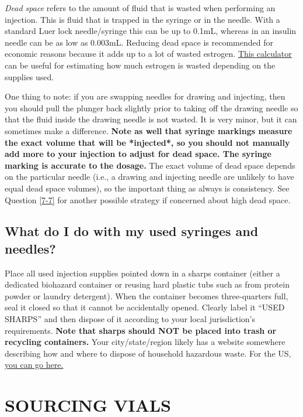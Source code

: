 \documentclass{article}
\begin{document}
\textit{Dead space} refers to the amount of fluid that is wasted when performing an injection. This is fluid that is trapped in the syringe or in the needle. With a standard Luer lock needle/syringe this can be up to 0.1mL, whereas in an insulin needle can be as low as 0.003mL. Reducing dead space is recommended for economic reasons because it adds up to a lot of wasted estrogen. \href{https://hrtcafe.net/Calc/}{This calculator} can be useful for estimating how much estrogen is wasted depending on the supplies used.

One thing to note: if you are swapping needles for drawing and injecting, then you should pull the plunger back slightly prior to taking off the drawing needle so that the fluid inside the drawing needle is not wasted. It is very minor, but it can sometimes make a difference. \textbf{Note as well that syringe markings measure the exact volume that will be *injected*, so you should not manually add more to your injection to adjust for dead space. The syringe marking is accurate to the dosage.} The exact volume of dead space depends on the particular needle (i.e., a drawing and injecting needle are unlikely to have equal dead space volumes), so the important thing as always is consistency. See Question \ref{7-7} for another possible strategy if concerned about high dead space.

\subsection{What do I do with my used syringes and needles?}\label{5-27}

Place all used injection supplies pointed down in a sharps container (either a dedicated biohazard container or reusing hard plastic tubs such as from protein powder or laundry detergent). When the container becomes three-quarters full, seal it closed so that it cannot be accidentally opened. Clearly label it “USED SHARPS” and then dispose of it according to your local jurisdiction's requirements. \textbf{Note that sharps should NOT be placed into trash or recycling containers.} Your city/state/region likely has a website somewhere describing how and where to dispose of household hazardous waste. For the US, \href{https://safeneedledisposal.org/}{you can go here.}



\section{SOURCING VIALS}\label{sv}
\end{document}
